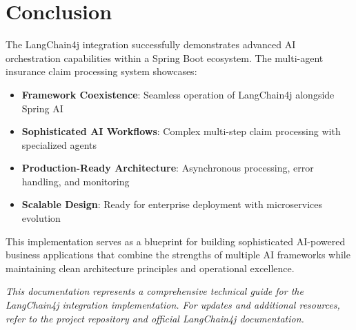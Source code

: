 \documentclass[12pt,a4paper]{article}
\begin{document}
\section{Conclusion}

The LangChain4j integration successfully demonstrates advanced AI orchestration capabilities within a Spring Boot ecosystem. The multi-agent insurance claim processing system showcases:

\begin{itemize}
    \item \textbf{Framework Coexistence}: Seamless operation of LangChain4j alongside Spring AI
    \item \textbf{Sophisticated AI Workflows}: Complex multi-step claim processing with specialized agents
    \item \textbf{Production-Ready Architecture}: Asynchronous processing, error handling, and monitoring
    \item \textbf{Scalable Design}: Ready for enterprise deployment with microservices evolution
\end{itemize}

This implementation serves as a blueprint for building sophisticated AI-powered business applications that combine the strengths of multiple AI frameworks while maintaining clean architecture principles and operational excellence.

\vfill
\textit{This documentation represents a comprehensive technical guide for the LangChain4j integration implementation. For updates and additional resources, refer to the project repository and official LangChain4j documentation.}
\end{document}
